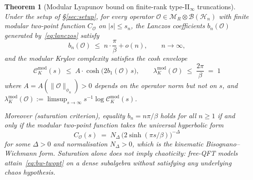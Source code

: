 \documentclass[12pt,a4paper]{article}
\newtheorem{theorem}{Theorem}
\begin{document}
\begin{theorem}[Modular Lyapunov bound on finite-rank type-II$_\infty$
truncations]\label{thm:bound}
Under the setup of \S\ref{sec:setup}, for every operator
$\mathcal{O} \in \mathcal{M}_R \otimes \mathcal{B}(\mathcal{H}_n)$
with finite modular two-point function $C_\mathcal{O}$ on
$|s|\le s_n$, the Lanczos coefficients $b_n(\mathcal{O})$ generated
by~\eqref{eq:lanczos} satisfy
\begin{equation}
  b_n(\mathcal{O})
  \;\le\; n \cdot \frac{\pi}{\beta} + o(n),
  \qquad n \to \infty,
  \label{eq:bn-bound}
\end{equation}
and the modular Krylov complexity satisfies the cosh envelope
\begin{equation}
  \mathcal{C}_K^{\mathrm{mod}}(s)
  \;\le\;
  A \cdot \cosh\!\bigl(2 b_1(\mathcal{O})\, s\bigr),
  \qquad
  \lambda_K^{\mathrm{mod}}(\mathcal{O})
  \;\le\; \frac{2\pi}{\beta}
  \;=\; 1
  \label{eq:cosh-env}
\end{equation}
where $A = A(\|\mathcal{O}\|_{\phi_n}) > 0$ depends on the operator
norm but not on $s$, and $\lambda_K^{\mathrm{mod}}(\mathcal{O}) :=
\limsup_{s\to\infty} s^{-1} \log \mathcal{C}_K^{\mathrm{mod}}(s)$.

Moreover (saturation criterion), equality $b_n = n\pi/\beta$ holds for
all $n\ge 1$ if and only if the modular two-point function takes the
universal hyperbolic form
\begin{equation}
  C_\mathcal{O}(s)
  \;=\;
  N_\Delta\,\bigl(2\sinh(\pi s/\beta)\bigr)^{-\Delta}
  \label{eq:bw-twopt}
\end{equation}
for some $\Delta > 0$ and normalisation $N_\Delta > 0$, which is the
kinematic Bisognano--Wichmann form. Saturation alone does \emph{not}
imply chaoticity: free-QFT models~\cite{AvdoshkinDymarsky2019,Camargo2023}
attain~\eqref{eq:bw-twopt} on a dense subalgebra without satisfying
any underlying chaos hypothesis.
\end{theorem}
\end{document}
